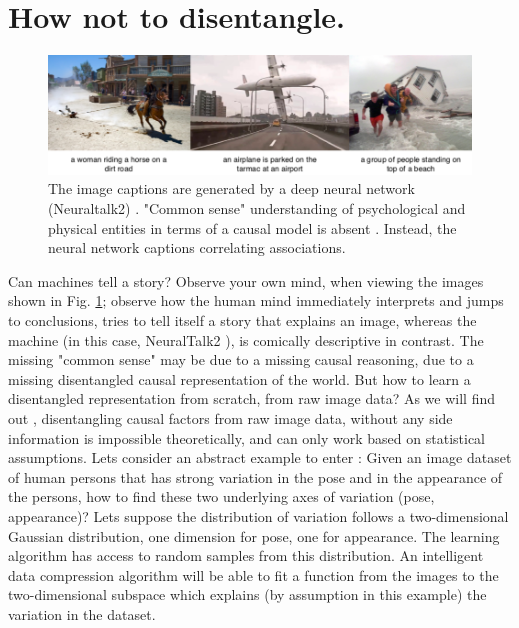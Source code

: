 \section{How not to disentangle.}
	\begin{figure}[t]
		\centering
		\includegraphics[trim={0cm 0cm 0cm 0cm},clip, width=1.\linewidth]{fig/notcausal}
		\caption{The image captions are generated by a deep neural network (Neuraltalk2) \cite{karpathy15neuraltalk}. "Common sense" understanding of psychological and physical entities in terms of a causal model is absent \cite{tenenbaum18think}. Instead, the neural network captions correlating associations.}
		\label{fig:notcausal}
	\end{figure}
	Can machines tell a story? Observe your own mind, when viewing the images shown in Fig. \ref{fig:notcausal}; observe how the human mind immediately interprets and jumps to conclusions, tries to tell itself a story that explains an image, whereas the machine (in this case, NeuralTalk2 \cite{karpathy15neuraltalk}), is comically descriptive in contrast. 
	The missing "common sense" may be due to a missing causal reasoning, due to a missing disentangled causal representation of the world.
	But how to learn a disentangled representation from scratch, \ie from raw image data?
	As we will find out , disentangling causal factors from raw image data, without any side information is impossible theoretically, and can only work based on statistical assumptions. 
	Lets consider an abstract example to enter :
	Given an image dataset of human persons that has strong variation in the pose and in the appearance of the persons, how to find these two underlying axes of variation (pose, appearance)? Lets suppose the distribution of variation follows a two-dimensional Gaussian distribution, one dimension for pose, one for appearance. The learning algorithm has access to random samples from this distribution. An intelligent data compression algorithm will be able to fit a function from the images to the two-dimensional subspace which explains (by assumption in this example) the variation in the dataset.
